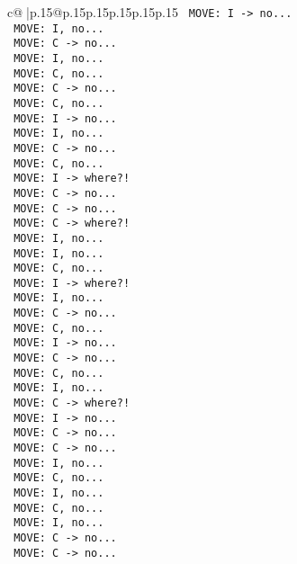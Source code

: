 \documentclass{article}
\begin{document}
{\begin{supertabular}{c@{$\;$}|p{.15\linewidth}@{}p{.15\linewidth}p{.15\linewidth}p{.15\linewidth}p{.15\linewidth}p{.15\linewidth}}
{{{\texttt{ MOVE: I {-}> no...} \\
\texttt{ MOVE: I, no...} \\
\texttt{ MOVE: C {-}> no...} \\
\texttt{ MOVE: I, no...} \\
\texttt{ MOVE: C, no...} \\
\texttt{ MOVE: C {-}> no...} \\
\texttt{ MOVE: C, no...} \\
\texttt{ MOVE: I {-}> no...} \\
\texttt{ MOVE: I, no...} \\
\texttt{ MOVE: C {-}> no...} \\
\texttt{ MOVE: C, no...} \\
\texttt{ MOVE: I {-}> where?!} \\
\texttt{ MOVE: C {-}> no...} \\
\texttt{ MOVE: C {-}> no...} \\
\texttt{ MOVE: C {-}> where?!} \\
\texttt{ MOVE: I, no...} \\
\texttt{ MOVE: I, no...} \\
\texttt{ MOVE: C, no...} \\
\texttt{ MOVE: I {-}> where?!} \\
\texttt{ MOVE: I, no...} \\
\texttt{ MOVE: C {-}> no...} \\
\texttt{ MOVE: C, no...} \\
\texttt{ MOVE: I {-}> no...} \\
\texttt{ MOVE: C {-}> no...} \\
\texttt{ MOVE: C, no...} \\
\texttt{ MOVE: I, no...} \\
\texttt{ MOVE: C {-}> where?!} \\
\texttt{ MOVE: I {-}> no...} \\
\texttt{ MOVE: C {-}> no...} \\
\texttt{ MOVE: C {-}> no...} \\
\texttt{ MOVE: I, no...} \\
\texttt{ MOVE: C, no...} \\
\texttt{ MOVE: I, no...} \\
\texttt{ MOVE: C, no...} \\
\texttt{ MOVE: I, no...} \\
\texttt{ MOVE: C {-}> no...} \\
\texttt{ MOVE: C {-}> no...} \\
}}}
\end{supertabular}}
\end{document}
